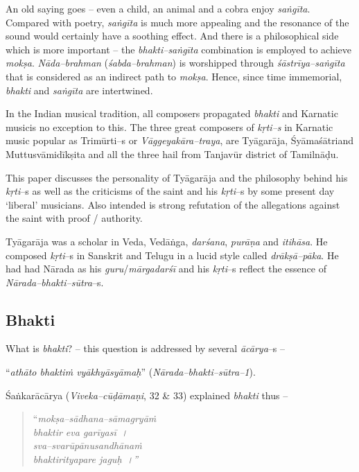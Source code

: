 An old saying goes – even a child, an animal and a cobra enjoy \textit{saṅgīta}. Compared with poetry, \textit{saṅgīta} is much more appealing and the resonance of the sound would certainly have a soothing effect. And there is a philosophical side which is more important – the \textit{bhakti–saṅgīta} combination is employed to achieve \textit{mokṣa}. \textit{Nāda–brahman} (\textit{śabda–brahman}) is worshipped through \textit{śāstrīya–saṅgīta} that is considered as an indirect path to \textit{mokṣa}. Hence, since time immemorial, \textit{bhakti} and \textit{saṅgīta} are intertwined. 

In the Indian musical tradition, all composers propagated \textit{bhakti} and Karnatic musicis no exception to this\textit{.} The three great composers of \textit{kṛti–s} in Karnatic music popular as Trimūrti–s or \textit{Vāggeyakāra–traya}, are Tyāgarāja, Śyāmaśātriand Muttusvāmidīkṣita and all the three hail from Tanjavūr district of Tamilnāḍu. 

This paper discusses the personality of Tyāgarāja and the philosophy behind his \textit{kṛti}–s as well as the criticisms of the saint and his \textit{kṛti}–s by some present day ‘liberal’ musicians. Also intended is strong refutation of the allegations against the saint with proof / authority.

Tyāgarāja was a scholar in Veda, Vedāṅga, \textit{darśana}, \textit{purāṇa} and \textit{itihāsa}. He composed \textit{kṛti}–s in Sanskrit and Telugu in a lucid style called \textit{drākṣā–pāka}. He had had Nārada as his \textit{guru}/\textit{mārgadarśī} and his \textit{kṛti}–s reflect the essence of \textit{Nārada–bhakti–sūtra}–s.

\subsection*{Bhakti}

What is \textit{bhakti}? – this question is addressed by several \textit{ācārya}–s – 

“\textit{athāto bhaktiṁ vyākhyāsyāmaḥ}” (\textit{Nārada–bhakti–sūtra–1}).

Śaṅkarācārya (\textit{Viveka–cūḍāmaṇi}, 32 \& 33) explained \textit{bhakti} thus –

\begin{verse}
“\textit{mokṣa–sādhana–sāmagryāṁ}\\\textit{bhaktir eva garīyasī~।}\\\textit{sva–svarūpānusandhānaṁ}\\\textit{bhaktirityapare jaguḥ~।”}
\end{verse}

